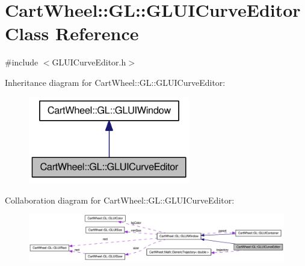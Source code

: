 \hypertarget{classCartWheel_1_1GL_1_1GLUICurveEditor}{
\section{CartWheel::GL::GLUICurveEditor Class Reference}
\label{classCartWheel_1_1GL_1_1GLUICurveEditor}
}


{\ttfamily \#include $<$GLUICurveEditor.h$>$}



Inheritance diagram for CartWheel::GL::GLUICurveEditor:\nopagebreak
\begin{figure}[H]
\begin{center}
\leavevmode
\includegraphics[width=200pt]{classCartWheel_1_1GL_1_1GLUICurveEditor__inherit__graph}
\end{center}
\end{figure}


Collaboration diagram for CartWheel::GL::GLUICurveEditor:\nopagebreak
\begin{figure}[H]
\begin{center}
\leavevmode
\includegraphics[width=400pt]{classCartWheel_1_1GL_1_1GLUICurveEditor__coll__graph}
\end{center}
\end{figure}
